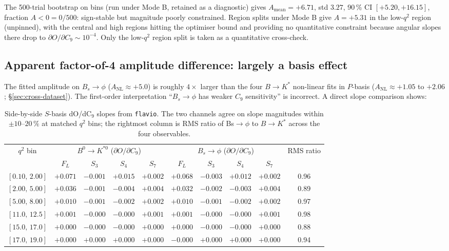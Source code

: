 The 500-trial bootstrap on bins (run under Mode B, retained as a
diagnostic) gives $A_{\mathrm{mean}}=+6.71$, std $3.27$, 90\,\% CI
$[+5.20,+16.15]$, fraction $A<0 = 0/500$: sign-stable but magnitude
poorly constrained. Region splits under Mode B give $A=+5.31$ in the
low-$q^{2}$ region (unpinned), with the central and high regions
hitting the optimiser bound and providing no quantitative constraint
because angular slopes there drop to
$\partial O/\partial C_{9}\sim 10^{-4}$. Only the low-$q^{2}$ region
split is taken as a quantitative cross-check.

\subsection{Apparent factor-of-4 amplitude difference: largely a basis effect}

The fitted amplitude on $B_{s}\to\phi$ ($A_{\mathrm{NL}}\approx +5.0$)
is roughly $4\times$ larger than the four $B \to K^{*}$ non-linear
fits in $P$-basis ($A_{\mathrm{NL}}\approx +1.05$ to $+2.06$;
\S\ref{sec:cross-dataset}). The first-order interpretation
``$B_{s}\to\phi$ has weaker $C_{9}$ sensitivity'' is incorrect.
A direct slope comparison shows:

\begin{table}[h]
\centering
\small
\begin{tabular}{cccccccccc}
\toprule
$q^{2}$ bin & \multicolumn{4}{c}{$B^{0}\to K^{*0}$ ($\partial O/\partial C_{9}$)} &
              \multicolumn{4}{c}{$B_{s}\to\phi$ ($\partial O/\partial C_{9}$)} &
              RMS ratio \\
            & $F_{L}$ & $S_{3}$ & $S_{4}$ & $S_{7}$ &
              $F_{L}$ & $S_{3}$ & $S_{4}$ & $S_{7}$ & \\
\midrule
$[0.10,\,2.00]$ & $+0.071$ & $-0.001$ & $+0.015$ & $+0.002$ &
                  $+0.068$ & $-0.003$ & $+0.012$ & $+0.002$ & 0.96 \\
$[2.00,\,5.00]$ & $+0.036$ & $-0.001$ & $-0.004$ & $+0.004$ &
                  $+0.032$ & $-0.002$ & $-0.003$ & $+0.004$ & 0.89 \\
$[5.00,\,8.00]$ & $+0.010$ & $-0.001$ & $-0.002$ & $+0.002$ &
                  $+0.010$ & $-0.001$ & $-0.002$ & $+0.002$ & 0.97 \\
$[11.0,\,12.5]$ & $+0.001$ & $-0.000$ & $-0.000$ & $+0.001$ &
                  $+0.001$ & $-0.000$ & $-0.000$ & $+0.001$ & 0.98 \\
$[15.0,\,17.0]$ & $+0.000$ & $-0.000$ & $-0.000$ & $+0.000$ &
                  $+0.000$ & $-0.000$ & $-0.000$ & $+0.000$ & 0.88 \\
$[17.0,\,19.0]$ & $+0.000$ & $+0.000$ & $+0.000$ & $+0.000$ &
                  $-0.000$ & $+0.000$ & $+0.000$ & $+0.000$ & 0.94 \\
\bottomrule
\end{tabular}
\caption{Side-by-side $S$-basis dO/dC$_{9}$ slopes from \texttt{flavio}.
The two channels agree on slope magnitudes within $\pm 10$--$20\,\%$ at
matched $q^{2}$ bins; the rightmost column is RMS ratio of Bs$\to\phi$
to $B\to K^{*}$ across the four observables.}
\label{tab:slopes_compare}
\end{table}

